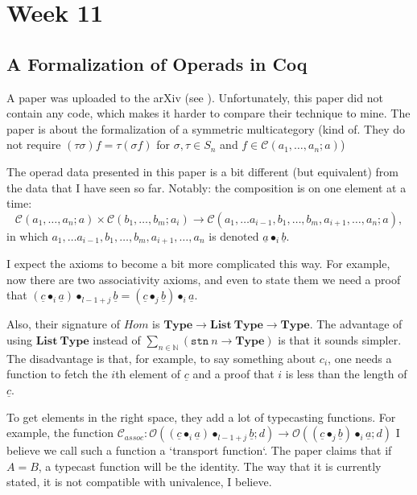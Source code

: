 \documentclass{amsbook}
\newcommand{\Catc}[1]{\mathcal{#1}}
\newcommand{\CC}{\Catc{C}}
\newcommand{\Catb}[1]{\mathbf{#1}}
\newcommand{\TYPE}{\Catb{Type}}
\newcommand{\Hom}[3]{{#1}\left(#2,#3\right)}
\theoremstyle{definition}
\begin{document}
  \chapter*{Week 11}

  \section{A Formalization of Operads in Coq}
  A paper was uploaded to the arXiv (see \cite{arxiv-operads}). Unfortunately, this paper did not contain any code, which makes it harder to compare their technique to mine. The paper is about the formalization of a symmetric multicategory (kind of. They do not require $ (\tau \sigma) f = \tau (\sigma f) $ for $ \sigma, \tau \in S_n $ and $ f \in \Hom{\CC}{a_1}{\dots, a_n;a} $)

  The operad data presented in this paper is a bit different (but equivalent) from the data that I have seen so far. Notably: the composition is on one element at a time:
  \[ \Hom{\CC}{a_1}{\dots, a_n;a} \times \Hom{\CC}{b_1}{\dots, b_m; a_i} \to \Hom{\CC}{a_1}{\dots a_{i-1}, b_1, \dots, b_m, a_{i+1}, \dots, a_n; a}, \]
  in which $ a_1, \dots a_{i-1}, b_1, \dots, b_m, a_{i+1}, \dots, a_n $ is denoted $ \underline{a} \bullet_{i} \underline{b} $.

  I expect the axioms to become a bit more complicated this way. For example, now there are two associativity axioms, and even to state them we need a proof that $ (\underline c \bullet_i \underline a) \bullet_{l - 1 + j} \underline b = (\underline c \bullet_j \underline b) \bullet_i \underline a $.

  Also, their signature of $ \ensuremath{Hom} $ is $ \TYPE \to \mathbf{List}\ \TYPE \to \TYPE $. The advantage of using $ \mathbf{List}\ \TYPE $ instead of $ \sum_{n \in \mathbb N} (\mathtt{stn}\ n \to \TYPE) $ is that it sounds simpler. The disadvantage is that, for example, to say something about $ c_i $, one needs a function to fetch the $ i $th element of $ \underline c $ and a proof that $ i $ is less than the length of $ \underline{c} $.

  To get elements in the right space, they add a lot of typecasting functions. For example, the function $ \mathcal C_{assoc}: \mathcal O((\underline c \bullet_i \underline a) \bullet_{l - 1 + j} \underline b; d) \to \mathcal O((\underline c \bullet_j \underline b) \bullet_i \underline a; d) $ I believe we call such a function a `transport function`. The paper claims that if $ A = B $, a typecast function will be the identity. The way that it is currently stated, it is not compatible with univalence, I believe.
\end{document}
